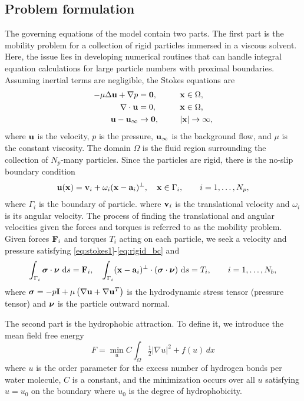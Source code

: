 \subsection{Problem formulation}
The governing equations of the model contain two parts. The first part
is the mobility problem for a collection of rigid particles immersed
in a viscous solvent. Here, the issue lies in developing numerical
routines that can handle integral equation calculations for large
particle numbers with proximal boundaries. Assuming inertial terms are
negligible, the Stokes equations are
\begin{alignat}{3}
\label{eq:stokes1}
  -\mu \Delta \mathbf{u} + \nabla p &= \mathbf{0}, 
    && \mathbf{x} \in \Omega, \\
\label{eq:stokes2}
  \nabla\cdot \mathbf{u} &= 0, \qquad && \mathbf{x} \in \Omega, \\
\label{eq:stokes3}
  \mathbf{u} - \mathbf{u}_\infty &\to \mathbf{0}, && |\mathbf{x}| \to \infty,
\end{alignat}
%
where $\mathbf{u}$ is the velocity, $p$ is the pressure, $\mathbf{u}_\infty$ is
the background flow, and $\mu$ is the constant viscosity. The domain
$\Omega$ is the fluid region surrounding the collection of
$N_p$-many particles. Since the particles are rigid, there is the
no-slip boundary condition
\begin{align}
\label{eq:rigid_bc}
  \mathbf{u}(\mathbf{x}) = \mathbf{v}_i + \omega_i  (\mathbf{x} - \mathbf{a}_i)^\perp, \quad
    \mathbf{x} \in \Gamma_i,\qquad  i=1,\ldots,N_p,
\end{align}
where $\Gamma_i$ is the boundary of particle. where $\mathbf{v}_i$ is the
translational velocity and $\omega_i$ is its angular velocity. The
process of finding the translational and angular velocities given
the forces and torques is referred to as the mobility problem. Given
forces $\mathbf{F}_i$ and torques $T_i$ acting on each particle, we seek a
velocity and pressure satisfying \eqref{eq:stokes1}-\eqref{eq:rigid_bc} 
and
\begin{equation}
  \label{eq:force}
  \int_{\Gamma_i} \ssigma \cdot \nnu \, \dif s = \FF_i,\quad 
  \int_{\Gamma_i} (\xx - \aa_i)^{\perp} \cdot (\ssigma \cdot \nnu) \,
  \dif s = T_i, \qquad i=1,\ldots,N_b,
\end{equation}
where
$\boldsymbol{\sigma} = -p \mathbf{I} + \mu \left(\nabla \mathbf{u} + \nabla \mathbf{u}^T \right)$
is the hydrodynamic stress tensor (pressure tensor) and $\boldsymbol{\nu}$ is the
particle outward normal. 

The second part is the hydrophobic attraction.  To define it, we introduce 
the mean field free energy
\begin{equation}
\label{eq:free_energy}
F = \min_u C \int_{\Omega}  \tfrac{1}{2} |\nabla u|^2 + f(u) \,dx
\end{equation}
where $u$ is the order parameter for the excess number of hydrogen bonds
per water molecule, $C$ is a constant, and the minimization occurs over
all $u$ satisfying $u = u_0$ on the boundary where $u_0$ is the degree
of hydrophobicity.  

